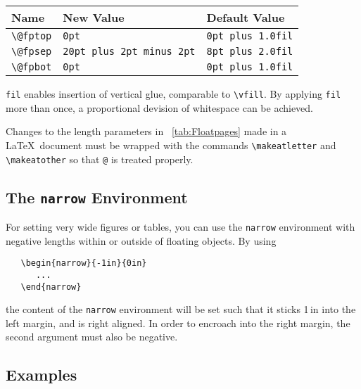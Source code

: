 \documentclass{article}
\begin{document}
\vskip 1pc
\begin{minipage}{\linewidth}
\centering%
%
\label{tab:Floatpages}%
\small%
\renewcommand{\arraystretch}{1.25}%
\begin{tabular}{@{}*{3}{l}@{}}\hline
   Name           & New Value                     & Default Value\\ \hline
   \verb|\@fptop| & \verb|0pt|                     & \verb|0pt plus 1.0fil|\\
   \verb|\@fpsep| & \verb|20pt plus 2pt minus 2pt| & \verb|8pt plus 2.0fil|\\
   \verb|\@fpbot| & \verb|0pt|                     & \verb|0pt plus 1.0fil|\\ \hline
\end{tabular}
\end{minipage}
\vskip 1pc

\noindent\verb|fil| enables insertion of vertical glue, comparable to \verb|\vfill|. By applying \verb|fil| more
than once, a proportional devision of whitespace can be achieved.

Changes to the length parameters in \tablename~\ref{tab:Floatpages} made in a \LaTeX\ document must be wrapped with the commands \verb|\makeatletter| and \verb|\makeatother| so that \verb|@|
is treated properly.

\subsection{The \texttt{narrow} Environment}

For setting very wide figures or tables, you can use the \verb|narrow| environment
with negative lengths within or outside of floating objects. By using 

\pagebreak
\begin{verbatim}
   \begin{narrow}{-1in}{0in}
      ...
   \end{narrow}
\end{verbatim}

\noindent the content of the \verb|narrow| environment will be set such that it sticks 1\,in into the left margin, and is right aligned. In order to encroach into the right margin, the second argument must also be negative.

\subsection{Examples}
\label{Examples}
\end{document}
